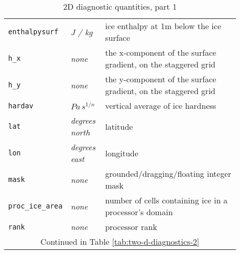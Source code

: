 \begin{table}[ht]
\begin{tabular}{p{0.15\linewidth}p{0.15\linewidth}p{0.6\linewidth}}
    \texttt{enthalpysurf} & \textsl{J  / kg} &  ice enthalpy at 1m below the ice surface \\
    \texttt{h_x} & \textsl{none} &  the x-component of the surface gradient, on the staggered grid\\
    \texttt{h_y} & \textsl{none} &  the y-component of the surface gradient, on the staggered grid\\
    \texttt{hardav} & $Pa\, s^{1/n}$ &  vertical average of ice hardness \\
    \texttt{lat} & \textsl{degrees north} & latitude \\
    \texttt{lon} & \textsl{degrees east} & longitude \\
    \texttt{mask} & \textsl{none} & grounded/dragging/floating integer mask \\
    \texttt{proc_ice_area} & \textsl{none} &  number of cells containing ice in a processor's domain \\
    \texttt{rank} & \textsl{none} &  processor rank \\
   \multicolumn{3}{c}{Continued in Table \ref{tab:two-d-diagnostics-2}}\\
  \bottomrule
  \end{tabular}
  \caption{2D diagnostic quantities, part 1}
  \label{tab:two-d-diagnostics-1}
\end{table}

